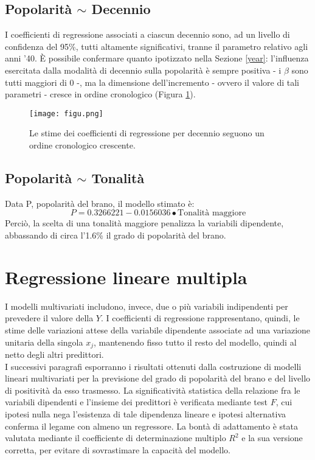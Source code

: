 \documentclass[fleqn,10pt]{SelfArx} %
\begin{document}
\subsection*{Popolarità $\sim$ Decennio}
I coefficienti di regressione associati a ciascun decennio sono, ad un livello di confidenza del 95\%, tutti altamente significativi, tranne il parametro relativo agli anni '40. È possibile confermare quanto ipotizzato nella Sezione \ref{year}: l'influenza esercitata dalla modalità di decennio sulla popolarità è sempre positiva - i $\beta$ sono tutti maggiori di 0 -, ma la dimensione dell'incremento - ovvero il valore di tali parametri - cresce in ordine cronologico (Figura \ref{fig:figu}).
\begin{figure}[h]
    \centering
    \texttt{[image: figu.png]}
    \label{fig:figu}
    \caption{Le stime dei coefficienti di regressione per decennio seguono un ordine cronologico crescente.}
\end{figure}

\subsection*{Popolarità $\sim$ Tonalità}
Data P, popolarità del brano, il modello stimato è:
\begin{equation}
    P=0.3266221-0.0156036\bullet\text{Tonalità maggiore}
\end{equation}
Perciò, la scelta di una tonalità maggiore penalizza la variabili dipendente, abbassando di circa l'1.6\% il grado di popolarità del brano.
\section{Regressione lineare multipla}
I modelli multivariati includono, invece, due o più variabili indipendenti per prevedere il valore della $Y$. I coefficienti di regressione rappresentano, quindi, le stime delle variazioni attese della variabile dipendente associate ad una variazione unitaria della singola $x_j$, mantenendo fisso tutto il resto del modello, quindi al netto degli altri predittori.\\
I successivi paragrafi esporranno i risultati ottenuti dalla costruzione di modelli lineari multivariati per la previsione del grado di popolarità del brano e del livello di positività da esso trasmesso. La significatività statistica della relazione fra le variabili dipendenti e l'insieme dei predittori è verificata mediante test $F$, cui ipotesi nulla nega l'esistenza di tale dipendenza lineare e ipotesi alternativa conferma il legame con almeno un regressore. La bontà di adattamento è stata valutata mediante il coefficiente di determinazione multiplo $R^2$ e la sua versione corretta, per evitare di sovrastimare la capacità del modello. 
\end{document}
